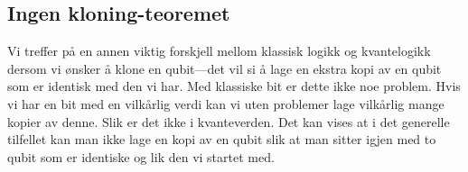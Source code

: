 \subsection{Ingen kloning-teoremet}
Vi treffer på en annen viktig forskjell mellom klassisk logikk og kvantelogikk dersom vi ønsker å klone en qubit---det vil si å lage en ekstra kopi av en qubit som er identisk med den vi har. Med klassiske bit er dette ikke noe problem. Hvis vi har en bit med en vilkårlig verdi kan vi uten problemer lage vilkårlig mange kopier av denne. Slik er det ikke i kvanteverden. Det kan vises at i det generelle tilfellet kan man ikke lage en kopi av en qubit slik at man sitter igjen med to qubit som er identiske og lik den vi startet med.